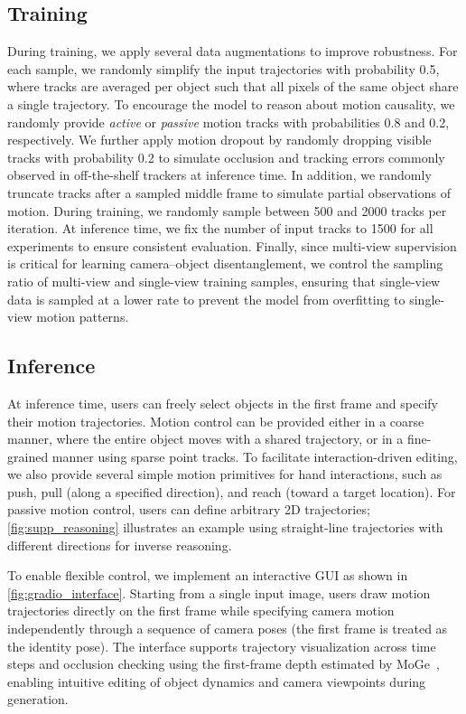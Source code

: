


\subsection{Training}

During training, we apply several data augmentations to improve robustness.
For each sample, we randomly simplify the input trajectories with probability 0.5, where tracks are averaged per object such that all pixels of the same object share a single trajectory.
To encourage the model to reason about motion causality, we randomly provide \emph{active} or \emph{passive} motion tracks with probabilities 0.8 and 0.2, respectively.
We further apply motion dropout by randomly dropping visible tracks with probability 0.2 to simulate occlusion and tracking errors commonly observed in off-the-shelf trackers at inference time.
In addition, we randomly truncate tracks after a sampled middle frame to simulate partial observations of motion.
During training, we randomly sample between 500 and 2000 tracks per iteration.
At inference time, we fix the number of input tracks to 1500 for all experiments to ensure consistent evaluation.
Finally, since multi-view supervision is critical for learning camera--object disentanglement, we control the sampling ratio of multi-view and single-view training samples, ensuring that single-view data is sampled at a lower rate to prevent the model from overfitting to single-view motion patterns.

\subsection{Inference}

At inference time, users can freely select objects in the first frame and specify their motion trajectories.
Motion control can be provided either in a coarse manner, where the entire object moves with a shared trajectory, or in a fine-grained manner using sparse point tracks.
To facilitate interaction-driven editing, we also provide several simple motion primitives for hand interactions, such as push, pull (along a specified direction), and reach (toward a target location).
For passive motion control, users can define arbitrary 2D trajectories; \cref{fig:supp_reasoning} illustrates an example using straight-line trajectories with different directions for inverse reasoning.

To enable flexible control, we implement an interactive GUI as shown in \cref{fig:gradio_interface}.
Starting from a single input image, users draw motion trajectories directly on the first frame while specifying camera motion independently through a sequence of camera poses (the first frame is treated as the identity pose).
The interface supports trajectory visualization across time steps and occlusion checking using the first-frame depth estimated by MoGe~\cite{wang2024moge}, enabling intuitive editing of object dynamics and camera viewpoints during generation.

